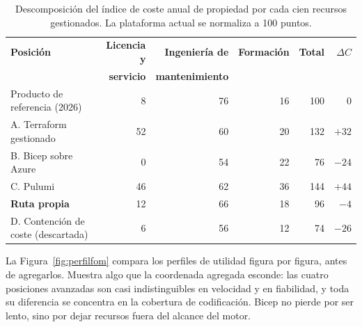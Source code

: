 \documentclass[11pt,letterpaper]{article}
\begin{document}
\begin{table}[ht]
  \centering
  \footnotesize
  \setlength{\tabcolsep}{5pt}
  \caption{Descomposición del índice de coste anual de propiedad por cada cien
  recursos gestionados. La plataforma actual se normaliza a 100 puntos.}
  \label{tab:coste}
  \begin{tabular}{@{}lrrrrr@{}}
    \toprule
    \textbf{Posición} & \textbf{Licencia y} & \textbf{Ingeniería de} &
      \textbf{Formación} & \textbf{Total} & \textbf{$\Delta C$} \\
    & \textbf{servicio} & \textbf{mantenimiento} & & & \\
    \midrule
    Producto de referencia (2026) &  8 & 76 & 16 & 100 & 0 \\
    \midrule
    A. Terraform gestionado       & 52 & 60 & 20 & 132 & $+32$ \\
    B. Bicep sobre Azure          &  0 & 54 & 22 &  76 & $-24$ \\
    C. Pulumi                     & 46 & 62 & 36 & 144 & $+44$ \\
    \textbf{Ruta propia}          & 12 & 66 & 18 &  96 & $-4$ \\
    \midrule
    D. Contención de coste (descartada) & 6 & 56 & 12 & 74 & $-26$ \\
    \bottomrule
  \end{tabular}
\end{table}

La Figura~\ref{fig:perfilfom} compara los perfiles de utilidad figura por
figura, antes de agregarlos. Muestra algo que la coordenada agregada esconde:
las cuatro posiciones avanzadas son casi indistinguibles en velocidad y en
fiabilidad, y toda su diferencia se concentra en la cobertura de codificación.
Bicep no pierde por ser lento, sino por dejar recursos fuera del alcance del
motor.
\end{document}

